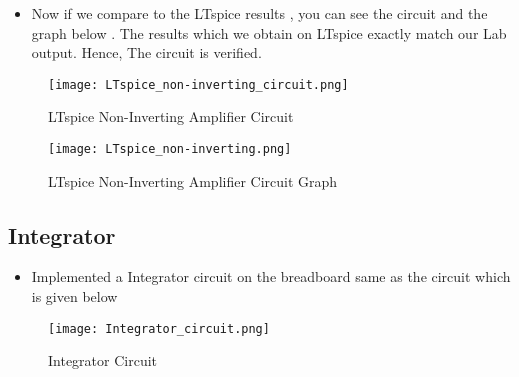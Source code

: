 \documentclass[9pt,conference]{IEEEtran}
\begin{document}
\begin{itemize}
    \item Now if we compare to the LTspice results , you can see the circuit and the graph below . The results which we obtain on LTspice exactly match our Lab output. Hence, The circuit is verified.
\end{itemize}
\begin{figure}[H]
    \centering
    \texttt{[image: LTspice\_non-inverting\_circuit.png]}
    \caption{LTspice Non-Inverting Amplifier Circuit}
    \label{fig:positive_clamper}
\end{figure}
\begin{figure}[H]
    \centering
    \texttt{[image: LTspice\_non-inverting.png]}
    \caption{LTspice Non-Inverting Amplifier Circuit Graph}
    \label{fig:positive_clamper}
\end{figure}

\subsection{Integrator}
\begin{itemize}
    \item Implemented a Integrator circuit on the breadboard same as the circuit which is given below
\end{itemize}
\begin{figure}[H]
    \centering
    \texttt{[image: Integrator\_circuit.png]}
    \caption{Integrator Circuit}
    \label{fig:clamper_circuit}
\end{figure}
\end{document}
